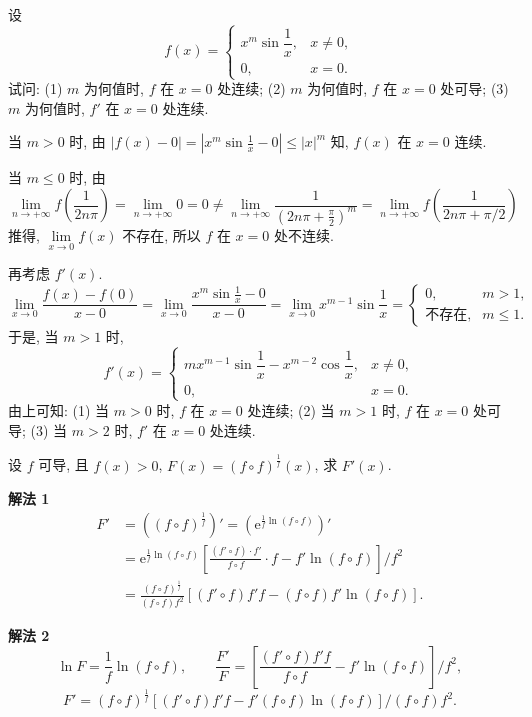 \begin{example}\label{ex:3.1.9}
设
\[
f(x) = \begin{cases}x^m\sin\dfrac{1}{x}, & x \neq 0,\\ 0, & x = 0.\end{cases}
\]
试问: (1) $m$ 为何值时, $f$ 在 $x=0$ 处连续; (2) $m$ 为何值时, $f$ 在 $x=0$ 处可导; (3) $m$ 为何值时, $f'$ 在 $x=0$ 处连续.
\end{example}

\begin{solution}
当 $m > 0$ 时, 由 $|f(x) - 0| = \left|x^m\sin\frac{1}{x} - 0\right| \leqslant |x|^m$ 知, $f(x)$ 在 $x=0$ 连续.

当 $m \leqslant 0$ 时, 由
\[
\lim_{n\to+\infty}f\left(\frac{1}{2n\pi}\right) = \lim_{n\to+\infty}0 = 0 \neq \lim_{n\to+\infty}\frac{1}{\left(2n\pi+\frac{\pi}{2}\right)^m} = \lim_{n\to+\infty}f\left(\frac{1}{2n\pi+\pi/2}\right)
\]
推得, $\lim\limits_{x\to0}f(x)$ 不存在, 所以 $f$ 在 $x=0$ 处不连续.

再考虑 $f'(x)$.
\[
\lim_{x\to0}\frac{f(x) - f(0)}{x - 0} = \lim_{x\to0}\frac{x^m\sin\frac{1}{x} - 0}{x - 0} = \lim_{x\to0}x^{m-1}\sin\frac{1}{x} = \begin{cases}0, & m > 1,\\ \text{不存在}, & m \leqslant 1.\end{cases}
\]
于是, 当 $m > 1$ 时,
\[
f'(x) = \begin{cases}mx^{m-1}\sin\dfrac{1}{x} - x^{m-2}\cos\dfrac{1}{x}, & x \neq 0,\\ 0, & x = 0.\end{cases}
\]
由上可知: (1) 当 $m > 0$ 时, $f$ 在 $x=0$ 处连续; (2) 当 $m > 1$ 时, $f$ 在 $x=0$ 处可导; (3) 当 $m > 2$ 时, $f'$ 在 $x=0$ 处连续.
\end{solution}

\begin{example}\label{ex:3.1.10}
设 $f$ 可导, 且 $f(x) > 0$, $F(x) = (f\circ f)^{\frac{1}{f}}(x)$, 求 $F'(x)$.
\end{example}

\begin{solution}
\textbf{解法 1}
\[
\begin{aligned}
F' &= ((f\circ f)^{\frac{1}{f}})' = (\mathrm{e}^{\frac{1}{f}\ln(f\circ f)})'\\
&= \mathrm{e}^{\frac{1}{f}\ln(f\circ f)}\left[\frac{(f'\circ f)\cdot f'}{f\circ f}\cdot f - f'\ln(f\circ f)\right]\Big/ f^2\\
&= \frac{(f\circ f)^{\frac{1}{f}}}{(f\circ f)f^2}\left[(f'\circ f)f'f - (f\circ f)f'\ln(f\circ f)\right].
\end{aligned}
\]

\textbf{解法 2}
\[
\ln F = \frac{1}{f}\ln(f\circ f),\qquad
\frac{F'}{F} = \left[\frac{(f'\circ f)f'f}{f\circ f} - f'\ln(f\circ f)\right]\Big/ f^2,
\]
\[
F' = (f\circ f)^{\frac{1}{f}}\left[(f'\circ f)f'f - f'(f\circ f)\ln(f\circ f)\right]/(f\circ f)f^2.
\]
\end{solution}

